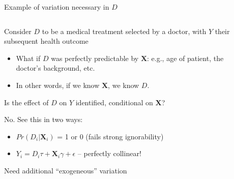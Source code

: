 \documentclass[notes,11pt, aspectratio=169]{beamer}
\newenvironment{wideitemize}{\itemize\addtolength{\itemsep}{10pt}}{\enditemize}
\begin{document}
\begin{frame}{Example of variation necessary in $D$}
\begin{columns}[T] %
\begin{column}{.8\textwidth}
  \begin{wideitemize}
  \item Consider $D$ to be a medical treatment selected by a doctor,
    with $Y$ their subsequent health outcome
    \begin{itemize}
    \item What if $D$ was perfectly predictable by $\mathbf{X}$: e.g., age of
      patient, the doctor's background, etc.
    \item  In other words, if we know $\mathbf{X}$, we know $D$.
    \end{itemize}
  \item Is the effect of $D$ on $Y$ identified, conditional on
    $\mathbf{X}$?
    \pause
  \item No. See this in two ways:
    \begin{itemize}
    \item $Pr(D_{i} | \mathbf{X}_{i})$ = 1 or 0 (fails strong ignorability)       
    \item $Y_{i} = D_{i}\tau + \mathbf{X}_{i}\gamma + \epsilon$ -- perfectly collinear!
    \end{itemize}
  \item Need additional ``exogeneous'' variation
    \end{wideitemize}
\end{column}%
\hfill%
\begin{column}{.4\textwidth}

\end{column}%
\end{columns}
\end{frame}
\end{document}
